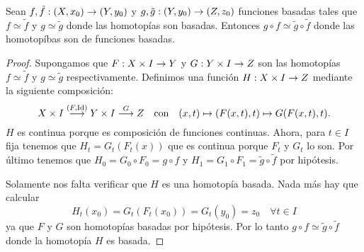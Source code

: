 \begin{ejercicio}\label{ej:16}
  Sean $f,\tilde{f}:(X,x_0)\rightarrow (Y,y_0)$ y $g,\tilde{g}:(Y,y_0)\rightarrow (Z,z_0)$ funciones basadas
  tales que $f\simeq \tilde{f}$ y $g\simeq\tilde{g}$ donde las homotop\'ias son basadas.
  Entonces $g\circ f\simeq \tilde{g}\circ\tilde{f}$ donde las homotop\'ibas son de funciones
  basadas.
\end{ejercicio}
\begin{proof}%
  Supongamos que $F:X\times I\rightarrow Y$ y $G:Y\times I\rightarrow Z$ son las homotop\'ias $f\simeq\tilde{f}$
  y $g\simeq\tilde{g}$ respectivamente. Definimos una funci\'on $H:X\times I\rightarrow Z$ mediante la
  siguiente composici\'on:
  \[
    X\times I \overset{(F,\text{Id})}{\longrightarrow} Y\times I \overset{G}{\longrightarrow} Z \quad\text{con}\quad
    (x,t)\mapsto (F(x,t),t)\mapsto G(F(x,t),t). 
  \]
  $H$ es continua porque es composici\'on de funciones continuas. Ahora, para $t\in I$
  fija tenemos que $H_t=G_t(F_t(x))$ que es continua porque $F_t$ y $G_t$ lo son. Por \'ultimo
  tenemos que $H_0=G_0\circ F_0=g\circ f$ y $H_1=G_1\circ F_1=\tilde{g}\circ\tilde{f}$ por
  hip\'otesis.

  Solamente nos falta verificar que $H$ es una homotop\'ia basada. Nada m\'as hay que calcular
  \[
    H_t(x_0)=G_t(F_t(x_0))=G_t(y_0)=z_0 \quad\forall t\in I
  \]
  ya que $F$ y $G$ son homotop\'ias basadas por hip\'otesis. Por lo tanto
  $g\circ f\simeq \tilde{g}\circ\tilde{f}$ donde la homotop\'ia $H$ es basada.

\end{proof}%


